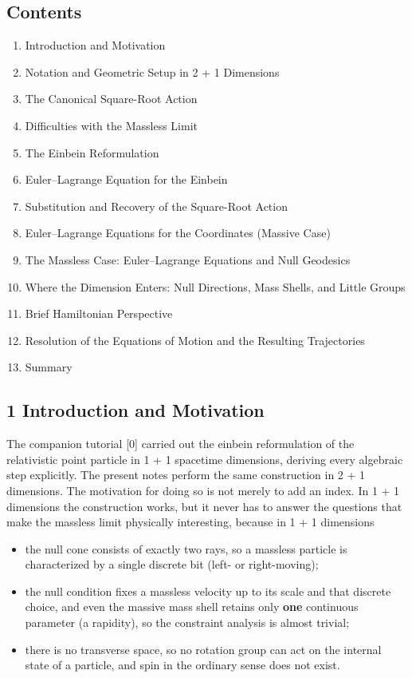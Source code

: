 \documentclass[
]{article}
\providecommand{\tightlist}{%
  \setlength{\itemsep}{0pt}\setlength{\parskip}{0pt}}
\begin{document}
\hypertarget{contents}{%
\subsection{Contents}\label{contents}}

\begin{enumerate}
\def\labelenumi{\arabic{enumi}.}
\tightlist
\item
  Introduction and Motivation
\item
  Notation and Geometric Setup in 2 + 1 Dimensions
\item
  The Canonical Square-Root Action
\item
  Difficulties with the Massless Limit
\item
  The Einbein Reformulation
\item
  Euler--Lagrange Equation for the Einbein
\item
  Substitution and Recovery of the Square-Root Action
\item
  Euler--Lagrange Equations for the Coordinates (Massive Case)
\item
  The Massless Case: Euler--Lagrange Equations and Null Geodesics
\item
  Where the Dimension Enters: Null Directions, Mass Shells, and Little
  Groups
\item
  Brief Hamiltonian Perspective
\item
  Resolution of the Equations of Motion and the Resulting Trajectories
\item
  Summary
\end{enumerate}

\hypertarget{introduction-and-motivation}{%
\subsection{1 Introduction and
Motivation}\label{introduction-and-motivation}}

The companion tutorial {[}0{]} carried out the einbein reformulation of
the relativistic point particle in 1 + 1 spacetime dimensions, deriving
every algebraic step explicitly. The present notes perform the same
construction in 2 + 1 dimensions. The motivation for doing so is not
merely to add an index. In 1 + 1 dimensions the construction works, but
it never has to answer the questions that make the massless limit
physically interesting, because in 1 + 1 dimensions

\begin{itemize}
\tightlist
\item
  the null cone consists of exactly two rays, so a massless particle is
  characterized by a single discrete bit (left- or right-moving);
\item
  the null condition fixes a massless velocity up to its scale and that
  discrete choice, and even the massive mass shell retains only
  \textbf{one} continuous parameter (a rapidity), so the constraint
  analysis is almost trivial;
\item
  there is no transverse space, so no rotation group can act on the
  internal state of a particle, and spin in the ordinary sense does not
  exist.
\end{itemize}
\end{document}
